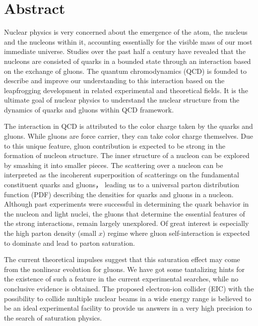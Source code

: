 \chapter*{\LARGE \bfseries {Abstract}}

\normalsize { 

Nuclear physics is very concerned about the emergence of the atom, the nucleus
and the nucleons within it, accounting essentially for the visible mass of our
most immediate universe. Studies over the past half a century have revealed that
the nucleons are consisted of quarks in a bounded state through an interaction
based on the exchange of gluons. The quantum chromodynamics (QCD) is founded to
describe and improve our understanding to this interaction based on the
leapfrogging development in related experimental and theoretical fields. It is
the ultimate goal of nuclear physics to understand the nuclear structure from
the dynamics of quarks and gluons within QCD framework.

The interaction in QCD is attributed to the color charge taken by the quarks
and gluons. While gluons are force carrier, they can take color charge themselves.
Due to this unique feature, gluon contribution is expected to be strong in the
formation of nucleon structure. The inner structure of a nucleon can be explored
by smashing it into smaller pieces. The scattering over a nucleon can be interpreted
as the incoherent superposition of scatterings on the fundamental constituent
quarks and gluons， leading us to a universal parton distribution function (PDF)
describing the densities for quarks and gluons in a nucleon. Although past
experiments were successful in determining the quark behavior in the nucleon and
light nuclei, the gluons that determine the essential features of the strong
interactions, remain largely unexplored. Of great interest is especially the
high parton density (small $x$) regime where gluon self-interaction is expected to
dominate and lead to parton saturation. 

The current theoretical impulses suggest that this saturation effect may come
from the nonlinear evolution for gluons. We have got some tantalizing hints
for the existence of such a feature in the current experimental searches, while
no conclusive evidence is obtained. The proposed electron-ion collider (EIC) with
the possibility to collide multiple nuclear beams in a wide energy range is
believed to be an ideal experimental facility to provide us answers in a very high
precision to the search of saturation physics.

}
